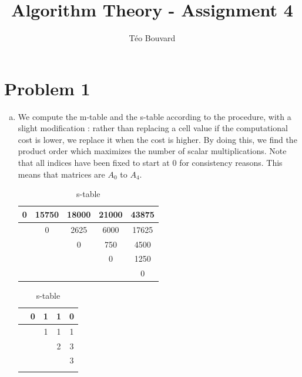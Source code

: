 \documentclass[a4paper, 10pt, twoside]{article}
\begin{document}
\title{Algorithm Theory - Assignment 4}
\author{T\'eo Bouvard}
\maketitle

\section*{Problem 1}
\begin{enumerate}[a)]
	\item We compute the m-table and the s-table according to the  procedure, with a slight modification : rather than replacing a cell value if the computational cost is lower, we replace it when the cost is higher. By doing this, we find the product order which maximizes the number of scalar multiplications. Note that all indices have been fixed to start at 0 for consistency reasons. This means that matrices are $A_0$ to $A_4$.

	      \begin{table}[!htb]
		      \begin{minipage}{.66\textwidth}
			      \centering
			      \caption{m-table}
			      \begin{tabular}{|c|c|c|c|c|}
				      \hline
				      0 & 15750 & 18000 & 21000 & 43875 \\ \hline
				        & 0     & 2625  & 6000  & 17625 \\ \hline
				        &       & 0     & 750   & 4500  \\ \hline
				        &       &       & 0     & 1250  \\ \hline
				        &       &       &       & 0     \\ \hline
			      \end{tabular}
		      \end{minipage}
		      \begin{minipage}{.33\textwidth}
			      \centering
			      \caption{s-table}
			      \begin{tabular}{|c|c|c|c|c|}
				      \hline
				       & 0 & 1 & 1 & 0 \\ \hline
				       &   & 1 & 1 & 1 \\ \hline
				       &   &   & 2 & 3 \\ \hline
				       &   &   &   & 3 \\ \hline
				       &   &   &   &   \\ \hline
			      \end{tabular}
		      \end{minipage}
	      \end{table}


\end{enumerate}
\end{document}
